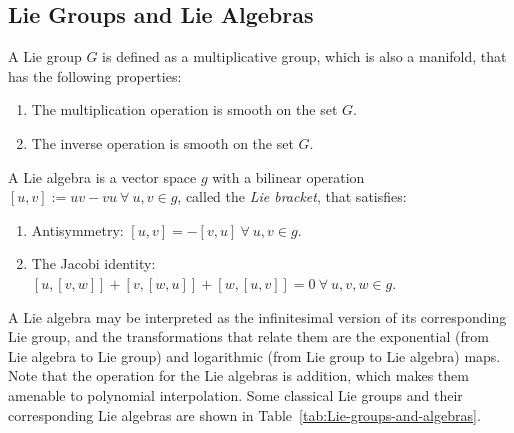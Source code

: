 \documentclass[12pt]{article}
\begin{document}
\subsection{Lie Groups and Lie Algebras}

A Lie group $G$ is defined as a
multiplicative group, which is also a manifold, that has the following
properties:
\begin{enumerate}
  \item The multiplication operation is smooth on the set $G$.
  \item The inverse operation is smooth on the set $G$.
\end{enumerate}

A Lie algebra is a vector space $g$ with a bilinear operation $[u,v]
:= uv - vu \: \forall \: u,v \in g$, called the \emph{Lie bracket}, that
satisfies:
\begin{enumerate}
  \item Antisymmetry: $[u,v] = - [v,u] \: \forall \: u,v \in g$.
  \item The Jacobi identity: $[u,[v,w]] + [v,[w,u]] + [w,[u,v]] = 0 \:
    \forall \: u,v,w \in g$.
\end{enumerate}
A Lie algebra may be interpreted as the infinitesimal version of its
corresponding Lie group, and the transformations that relate them are
the exponential (from Lie algebra to Lie group) and logarithmic (from
Lie group to Lie algebra) maps. Note that the operation for the Lie
algebras is addition, which makes them amenable to polynomial
interpolation. Some classical Lie groups and their corresponding Lie
algebras are shown in Table~\ref{tab:Lie-groups-and-algebras}.
\end{document}

